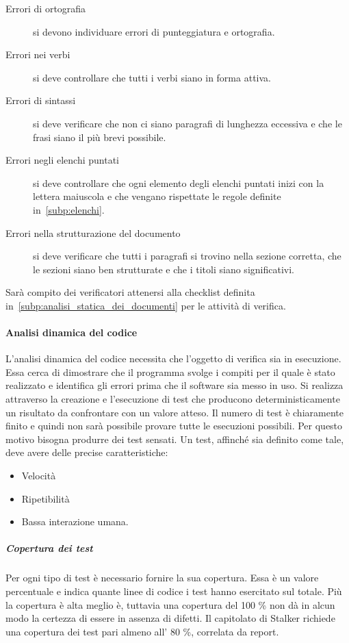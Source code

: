 \documentclass[../norme-di-progetto.tex]{subfiles}
\begin{document}
\begin{description}
  \item [Errori di ortografia] si devono individuare errori di punteggiatura e ortografia.
  \item [Errori nei verbi] si deve controllare che tutti i verbi siano in forma attiva.
  \item [Errori di sintassi] si deve verificare che non ci siano paragrafi di lunghezza eccessiva e che le frasi siano il più brevi possibile.
  \item [Errori negli elenchi puntati] si deve controllare che ogni elemento degli elenchi puntati inizi con la lettera maiuscola e che vengano rispettate le regole definite in~\ref{subp:elenchi}.
  \item [Errori nella strutturazione del documento] si deve verificare che tutti i paragrafi si trovino nella sezione corretta, che le sezioni siano ben strutturate e che i titoli siano significativi.
\end{description}

Sarà compito dei verificatori attenersi alla checklist definita in~\ref{subp:analisi_statica_dei_documenti} per le attività di verifica.

\paragraph{Analisi dinamica del codice}%
\label{par:analisi_dinamica_del_codice}
L'analisi dinamica del codice necessita che l'oggetto di verifica sia in esecuzione.
Essa cerca di dimostrare che il programma svolge i compiti per il quale è stato realizzato e identifica gli errori prima che il software sia messo in uso.
Si realizza attraverso la creazione e l'esecuzione di test che producono deterministicamente un risultato da confrontare con un valore atteso.
Il numero di test è chiaramente finito e quindi non sarà possibile provare tutte le esecuzioni possibili.
Per questo motivo bisogna produrre dei test sensati.
Un test, affinché sia definito come tale, deve avere delle precise caratteristiche:

\begin{itemize}
  \item Velocità
  \item Ripetibilità
  \item Bassa interazione umana.
\end{itemize}

\subparagraph{Copertura dei test}%
\label{subp:copertura_dei_test}
Per ogni tipo di test è necessario fornire la sua copertura.
Essa è un valore percentuale e indica quante linee di codice i test hanno esercitato sul totale.
Più la copertura è alta meglio è, tuttavia una copertura del 100 \% non dà in alcun modo la certezza di essere in assenza di difetti.
Il capitolato di Stalker richiede una copertura dei test pari almeno all' 80 \%, correlata da report.
\end{document}
